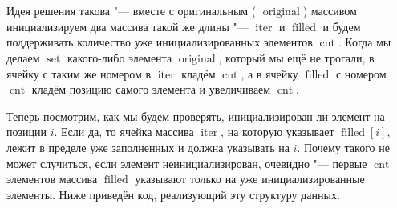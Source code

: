 \section{}
	Идея решения такова "--- вместе с оригинальным ( $\operatorname{original}$) массивом инициализируем два массива такой же длины "---  $\operatorname{iter}$ и  $\operatorname{filled}$ и будем поддерживать количество уже инициализированных элементов  $\operatorname{cnt}$. Когда мы делаем  $\operatorname{set}$ какого-либо элемента  $\operatorname{original}$, который мы ещё не трогали, в ячейку с таким же номером в  $\operatorname{iter}$ кладём  $\operatorname{cnt}$, а в ячейку  $\operatorname{filled}$ с номером  $\operatorname{cnt}$ кладём позицию самого элемента и увеличиваем  $\operatorname{cnt}$.
	
	Теперь посмотрим, как мы будем проверять, инициализирован ли элемент на позиции  $i$. Если да, то ячейка массива $\operatorname{iter}$, на которую указывает  $\operatorname{filled}[i]$, лежит в пределе уже заполненных и должна указывать на  $i$. Почему такого не может случиться, если элемент неинициализирован, очевидно "--- первые  $\operatorname{cnt}$ элементов массива  $\operatorname{filled}$ указывают только на уже инициализированные элементы. Ниже приведён код, реализующий эту структуру данных.
	
	
